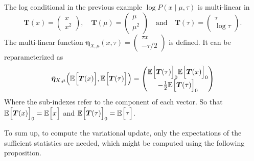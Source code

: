 \begin{exampleth}
    The log conditional in the previous example \(\log P(x \mid \mu, \tau)\) is multi-linear in
  \[
    \bm{T}(x) = \begin{pmatrix} x\\ x^{2} \end{pmatrix}, \quad \bm{T}(\mu) = \begin{pmatrix} \mu\\ \mu^{2} \end{pmatrix} \quad \text{and} \quad \bm{T}(\tau) = \begin{pmatrix} \tau\\ \log \tau \end{pmatrix}.
  \]
The multi-linear function \( \bm{\eta}_{X,\mu}(x,\tau) =  \begin{pmatrix}
            \tau x\\
            -\tau/2
          \end{pmatrix}\) is defined. It can be reparameterized as
          \[
            \bar{\bm{\eta}}_{X,\mu}\Big(\mathbb{E}_{}\Big[\bm{T}(x)\Big],\mathbb{E}_{}\Big[\bm{T}(\tau)\Big]\Big) =  \begin{pmatrix}
            \mathbb{E}_{}\Big[\bm{T}(\tau)\Big]_{0} \mathbb{E}_{}\Big[\bm{T}(x)\Big]_{0}\\
            -\frac{1}{2}\mathbb{E}_{}\Big[\bm{T}(\tau)\Big]_{0}
          \end{pmatrix}\]
        Where the sub-indexes refer to the component of each vector. So that \(  \mathbb{E}_{}\Big[\bm{T}(x)\Big]_{0} = \mathbb{E}_{}\Big[x\Big]  \) and \(  \mathbb{E}_{}\Big[\bm{T}(\tau)\Big]_{0} = \mathbb{E}_{}\Big[\tau\Big]  \).
\end{exampleth}

To sum up, to compute the variational update, only the expectations of the sufficient statistics are needed, which might be computed using the following proposition.

